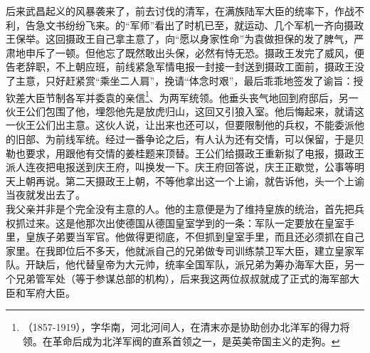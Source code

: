 后来武昌起义的风暴袭来了，前去讨伐的清军，在满族陆军大臣的统率下，作战不利，告急文书纷纷飞来。的“军师”看出了时机已至，就运动、几个军机一齐向摄政王保举。这回摄政王自己拿主意了，向“愿以身家性命”为袁做担保的发了脾气，严肃地申斥了一顿。但他忘了既然敢出头保，必然有恃无恐。摄政王发完了威风，便告老辞职，不上朝应班，前线紧急军情电报一封接一封送到摄政工面前，摄政王没了主意，只好赶紧赏“乘坐二人肩”，挽请“体念时艰”，最后乖乖地签发了谕旨：授钦差大臣节制各军并委袁的亲信\footnote{（1857-1919），字华南，河北河间人，在清末亦是协助创办北洋军的得力将领。在革命后成为北洋军阀的直系首领之一，是英美帝国主义的走狗。}、为两军统领。他垂头丧气地回到府邸后，另一伙王公们包围了他，埋怨他先是放虎归山，这回又引狼入室。他后悔起来，就请这一伙王公们出主意。这伙人说，让出来也还可以，但要限制他的兵权，不能委派他的旧部、为前线军统。经过一番争论之后，有人认为还有交情，可以保留，于是贝勒也要求，用跟他有交情的姜桂题来顶替。王公们给摄政王重新拟了电报，摄政王派人连夜把电报送到庆王府，叫换发一下。庆王府回答说，庆王正歇觉，公事等明天上朝再说。第二天摄政王上朝，不等他拿出这一个上谕，就告诉他，头一个上谕当夜就发出去了。\\

我父亲并非是个完全没有主意的人。他的主意便是为了维持皇族的统治，首先把兵权抓过来。这是他那次出使德国从德国皇室学到的一条：军队一定要放在皇室手里，皇族子弟要当军官。他做得更彻底，不但抓到皇室手里，而且还必须抓在自己家里。在我即位后不多天，他就派自己的兄弟做专司训练禁卫军大臣，建立皇家军队。开缺后，他代替皇帝为大元帅，统率全国军队，派兄弟为筹办海军大臣，另一个兄弟管军处（等于参谋总部的机构），后来我这两位叔叔就成了正式的海军部大臣和军府大臣。\\

